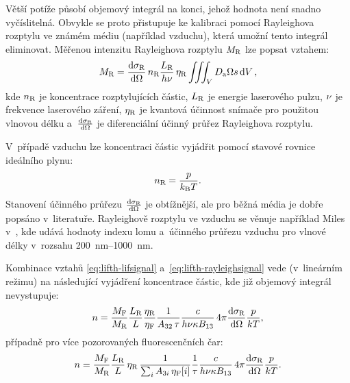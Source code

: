 Větší potíže působí objemový integrál na konci, jehož hodnota není snadno
vyčíslitelná.
Obvykle se proto přistupuje ke kalibraci pomocí Ray\-leigh\-ova rozptylu
ve známém médiu (například vzduchu),
která umožní tento integrál eliminovat.
Měřenou intenzitu Rayleighova rozptylu $M_\text{R}$ lze popsat vztahem:%
\autocite{lif-oh}
\begin{equation}
	\label{eq:lifth-rayleighsignal}
	M_\text{R} = \dv{\sigma_\text{R}}{\Omega} \, n_\text{R}
	\frac{L_\text{R}}{h\nu} \, \eta_\text{R}
	\iiint_V D_\text{a} \Omega s \dd{V},
\end{equation}
kde $n_\text{R}$ je koncentrace rozptylujících částic,
$L_\text{R}$ je energie laserového pulzu,
$\nu$ je frekvence laserového záření,
$\eta_\text{R}$ je kvantová účinnost snímače pro použitou vlnovou délku
a~$\dv{\sigma_\text{R}}{\Omega}$ je diferenciální účinný průřez Rayleighova rozptylu.

V~případě vzduchu lze koncentraci částic vyjádřit pomocí
stavové rovnice ideálního plynu:
\begin{equation}
	n_\text{R} = \frac{p}{k_\text{B}T}.
\end{equation}
Stanovení účinného průřezu $\dv{\sigma_\text{R}}{\Omega}$ je obtížnější,
ale pro běžná média je dobře popsáno v~literatuře.
Rayleighově rozptylu ve vzduchu se věnuje například Miles v~\cite{rayleigh},
kde udává hodnoty indexu lomu a~účinného průřezu vzduchu
pro vlnové délky v~rozsahu \SIrange{200}{1000}{\nano\metre}.

Kombinace vztahů \eqref{eq:lifth-lifsignal} a~\eqref{eq:lifth-rayleighsignal}
vede (v~lineárním režimu) na následující vyjádření koncentrace částic,
kde již objemový integrál nevystupuje:
\begin{equation}
	\label{eq:lifth-ndens}
	n = \frac{M_\text{F}}{M_\text{R}}
	\frac{L_\text{R}}{L}\frac{\eta_\text{R}}{\eta_\text{F}}
	\frac{1}{A_{32}\,\tau}
	\frac{c}{h\nu\kappa B_{13}}
	\, 4\pi \dv{\sigma_\text{R}}{\Omega} \frac{p}{kT},
\end{equation}
případně pro více pozorovaných fluorescenčních čar:
\begin{equation}
	\label{eq:lifth-ndens-multi}
	n = \frac{M_\text{F}}{M_\text{R}}
	\frac{L_\text{R}}{L} \, \eta_\text{R}
	\, \frac{1}{\sum_i A_{3i}\,\eta_\text{F}[i]}
	\frac{1}{\tau}
	\frac{c}{h\nu\kappa B_{13}}
	\, 4\pi \dv{\sigma_\text{R}}{\Omega} \frac{p}{kT}.
\end{equation}

